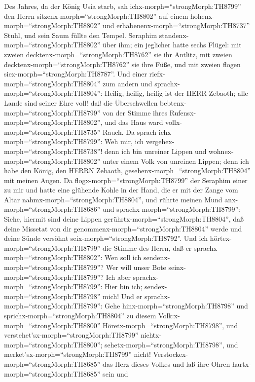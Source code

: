  Des Jahres, da der König Usia starb, sah
ichx-morph=``strongMorph:TH8799'' den Herrn
sitzenx-morph=``strongMorph:TH8802'' auf einem
hohenx-morph=``strongMorph:TH8802'' und
erhabenenx-morph=``strongMorph:TH8737'' Stuhl, und sein Saum füllte den
Tempel.  Seraphim standenx-morph=``strongMorph:TH8802'' über
ihm; ein jeglicher hatte sechs Flügel: mit zweien
decktenx-morph=``strongMorph:TH8762'' sie ihr Antlitz, mit zweien
decktenx-morph=``strongMorph:TH8762'' sie ihre Füße, und mit zweien
flogen siex-morph=``strongMorph:TH8787''.  Und einer
riefx-morph=``strongMorph:TH8804'' zum andern und
sprachx-morph=``strongMorph:TH8804'': Heilig, heilig, heilig ist der
HERR Zebaoth; alle Lande sind seiner Ehre voll!  daß die
Überschwellen bebtenx-morph=``strongMorph:TH8799'' von der Stimme ihres
Rufensx-morph=``strongMorph:TH8802'', und das Haus ward
vollx-morph=``strongMorph:TH8735'' Rauch.  Da sprach
ichx-morph=``strongMorph:TH8799'': Weh mir, ich
vergehex-morph=``strongMorph:TH8738''! denn ich bin unreiner Lippen und
wohnex-morph=``strongMorph:TH8802'' unter einem Volk von unreinen
Lippen; denn ich habe den König, den HERRN Zebaoth,
gesehenx-morph=``strongMorph:TH8804'' mit meinen Augen.  Da
flogx-morph=``strongMorph:TH8799'' der Seraphim einer zu mir und hatte
eine glühende Kohle in der Hand, die er mit der Zange vom Altar
nahmx-morph=``strongMorph:TH8804'',  und rührte meinen Mund
anx-morph=``strongMorph:TH8686'' und
sprachx-morph=``strongMorph:TH8799'': Siehe, hiermit sind deine Lippen
gerührtx-morph=``strongMorph:TH8804'', daß deine Missetat von dir
genommenx-morph=``strongMorph:TH8804'' werde und deine Sünde versöhnt
seix-morph=``strongMorph:TH8792''.  Und ich
hörtex-morph=``strongMorph:TH8799'' die Stimme des Herrn, daß er
sprachx-morph=``strongMorph:TH8802'': Wen soll ich
sendenx-morph=``strongMorph:TH8799''? Wer will unser Bote
seinx-morph=``strongMorph:TH8799''? Ich aber
sprachx-morph=``strongMorph:TH8799'': Hier bin ich;
sendex-morph=``strongMorph:TH8798'' mich!  Und er
sprachx-morph=``strongMorph:TH8799'': Gehe
hinx-morph=``strongMorph:TH8798'' und
sprichx-morph=``strongMorph:TH8804'' zu diesem
Volk:x-morph=``strongMorph:TH8800'' Höretx-morph=``strongMorph:TH8798'',
und verstehet'sx-morph=``strongMorph:TH8799''
nichtx-morph=``strongMorph:TH8800'';
sehetx-morph=``strongMorph:TH8798'', und
merket'sx-morph=``strongMorph:TH8799'' nicht! 
Verstockex-morph=``strongMorph:TH8685'' das Herz dieses Volkes und laß
ihre Ohren hartx-morph=``strongMorph:TH8685'' sein und
